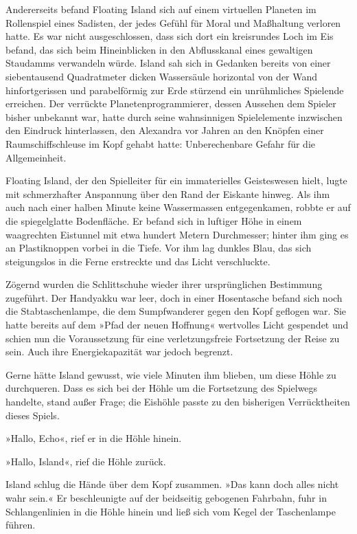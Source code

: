 Andererseits befand Floating Island sich auf einem virtuellen Planeten im Rollenspiel eines Sadisten, der jedes Gefühl für Moral und Maßhaltung verloren hatte. Es war nicht ausgeschlossen, dass sich dort ein kreisrundes Loch im Eis befand, das sich beim Hineinblicken in den Abflusskanal eines gewaltigen Staudamms verwandeln würde. Island sah sich in Gedanken bereits von einer siebentausend Quadratmeter dicken Wassersäule horizontal von der Wand hinfortgerissen und parabelförmig zur Erde stürzend ein unrühmliches Spielende erreichen. Der verrückte Planetenprogrammierer, dessen Aussehen dem Spieler bisher unbekannt war, hatte durch seine wahnsinnigen Spielelemente inzwischen den Eindruck hinterlassen, den Alexandra vor Jahren an den Knöpfen einer Raumschiffschleuse im Kopf gehabt hatte: Unberechenbare Gefahr für die Allgemeinheit.

Floating Island, der den Spielleiter für ein immaterielles Geisteswesen hielt, lugte mit schmerzhafter Anspannung über den Rand der Eiskante hinweg. Als ihm auch nach einer halben Minute keine Wassermassen entgegenkamen, robbte er auf die spiegelglatte Bodenfläche. Er befand sich in luftiger Höhe in einem waagrechten Eistunnel mit etwa hundert Metern Durchmesser; hinter ihm ging es an Plastiknoppen vorbei in die Tiefe. Vor ihm lag dunkles Blau, das sich steigungslos in die Ferne erstreckte und das Licht verschluckte.

Zögernd wurden die Schlittschuhe wieder ihrer ursprünglichen Bestimmung zugeführt. Der Handyakku war leer, doch in einer Hosentasche befand sich noch die Stabtaschenlampe, die dem Sumpfwanderer gegen den Kopf geflogen war. Sie hatte bereits auf dem »Pfad der neuen Hoffnung« wertvolles Licht gespendet und schien nun die Voraussetzung für eine verletzungsfreie Fortsetzung der Reise zu sein. Auch ihre Energiekapazität war jedoch begrenzt.

Gerne hätte Island gewusst, wie viele Minuten ihm blieben, um diese Höhle zu durchqueren. Dass es sich bei der Höhle um die Fortsetzung des Spielwegs handelte, stand außer Frage; die Eishöhle passte zu den bisherigen Verrücktheiten dieses Spiels.

»Hallo, Echo«, rief er in die Höhle hinein.

»Hallo, Island«, rief die Höhle zurück.

Island schlug die Hände über dem Kopf zusammen. »Das kann doch alles nicht wahr sein.« Er beschleunigte auf der beidseitig gebogenen Fahrbahn, fuhr in Schlangenlinien in die Höhle hinein und ließ sich vom Kegel der Taschenlampe führen.

